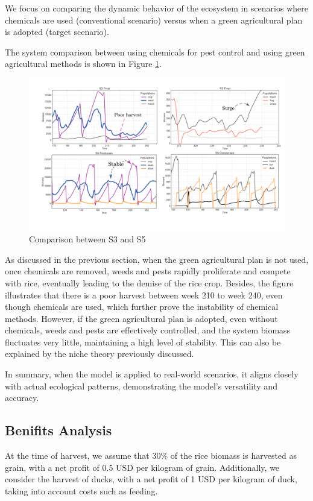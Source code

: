 \documentclass{HZNUMCM}
\begin{document}
          We focus on comparing the dynamic behavior of the ecosystem in scenarios 
          where chemicals are used (conventional scenario) versus when a green agricultural plan is adopted (target scenario).

          The system comparison between using chemicals for pest control and using green agricultural methods is shown in Figure \ref{fig:S3S5}.

          \begin{figure}
            \centering
            \includegraphics[width=\linewidth]{images/S3S5.png}
            \caption{Comparison between S3 and S5}
            \label{fig:S3S5}
          \end{figure}
          
          As discussed in the previous section, 
          when the green agricultural plan is not used, once chemicals are removed, 
          weeds and pests rapidly proliferate and compete with rice, eventually leading to the demise of the rice crop. 
          Besides, the figure illustrates that there is a poor harvest between week 210 to week 240, even though chemicals are used, 
          which further prove the instability of chemical methods.
          However, if the green agricultural plan is adopted, even without chemicals, weeds and pests are effectively controlled, 
          and the system biomass fluctuates very little, maintaining a high level of stability. 
          This can also be explained by the niche theory previously discussed.
          
          In summary, when the model is applied to real-world scenarios, it aligns closely with actual ecological patterns, 
          demonstrating the model's versatility and accuracy.
      \subsection{Benifits Analysis}
        At the time of harvest, we assume that 30\% of the rice biomass is harvested as grain, 
        with a net profit of 0.5 USD per kilogram of grain. Additionally, we consider the harvest of ducks, 
        with a net profit of 1 USD per kilogram of duck, taking into account costs such as feeding. 
        
\end{document}
